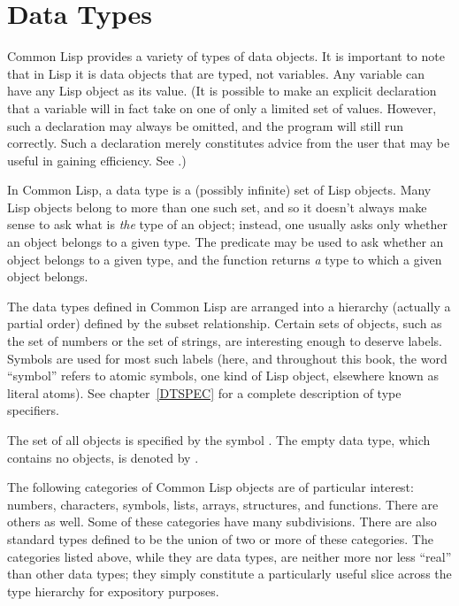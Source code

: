 
\clearpage\def\pagestatus{FINAL PROOF}

\ifx \rulang\Undef

\chapter{Data Types}
\label{DTYPES}

Common Lisp provides a variety of types of data objects.  It is important to
note that in Lisp it is data objects that are typed, not variables.
Any variable can have any Lisp object as its value.
(It is possible to make an explicit declaration that a variable will
in fact take on one of only a limited set of values.  However, such
a declaration may always be omitted, and the program will still run correctly.
Such a declaration merely constitutes advice from the user
that may be useful in gaining efficiency.  See .)

In Common Lisp, a data type is a (possibly infinite) set of
Lisp objects.  Many Lisp objects belong to more than one
such set, and so it doesn't always make sense to ask what is \emph{the} type
of an object; instead, one usually asks only whether an object belongs
to a given type.  The predicate  may be used to ask
whether an object belongs to a given type,
and the function  returns \emph{a} type
to which a given object belongs.

The data types defined in Common Lisp are arranged into a hierarchy (actually
a partial order) defined by the subset relationship.
Certain sets of objects, such as the set of numbers or the
set of strings, are interesting enough to deserve labels.
Symbols are used for most
such labels (here, and throughout this book, the word ``symbol''
refers to atomic symbols, one kind of Lisp object,
elsewhere known as literal atoms).  See chapter~\ref{DTSPEC}
for a complete description of type specifiers.

The set of all objects is specified
by the symbol {\true}.  The empty data type, which contains no objects, is
denoted by {\nil}.

The following categories of Common Lisp objects are of particular interest:
numbers, characters, symbols, lists, arrays, structures, and functions.
There are others as well.
Some of these categories
have many subdivisions.  There are also standard types defined to
be the union
of two or more of these categories.  The categories listed above, while they
are data types, are neither more nor less ``real'' than other data types;
they simply constitute a particularly useful slice across
the type hierarchy for expository purposes.

